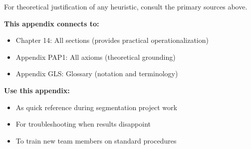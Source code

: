 For theoretical justification of any heuristic, consult the primary sources above.

\vspace{1em}

\noindent
\cite{rogers2003diffusion, angrist2010mostly, thaler2008nudge}

\vspace{0.5em}

\noindent
\nocite{bcm_master}


\begin{tcolorbox}[colback=white, colframe=black, title=Cross-Reference Footer]

\textbf{This appendix connects to:}
\begin{itemize}[nosep]
\item Chapter 14: All sections (provides practical operationalization)
\item Appendix PAP1: All axioms (theoretical grounding)
\item Appendix GLS: Glossary (notation and terminology)
\end{itemize}

\textbf{Use this appendix:}
\begin{itemize}[nosep]
\item As quick reference during segmentation project work
\item For troubleshooting when results disappoint
\item To train new team members on standard procedures
\end{itemize}

\end{tcolorbox}


